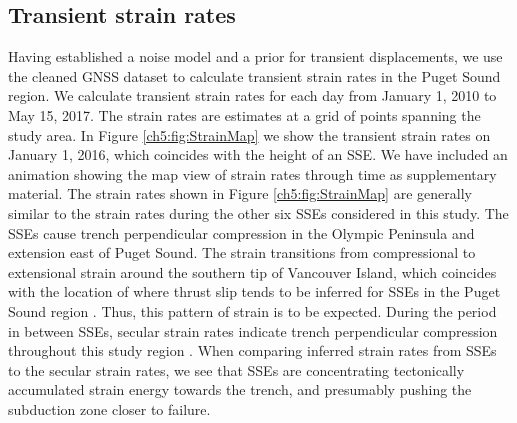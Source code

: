 \subsection{Transient strain rates}\label{ch5:sec:Results} 
Having established a noise model and a prior for transient
displacements, we use the cleaned GNSS dataset to calculate transient
strain rates in the Puget Sound region.  We calculate transient strain
rates for each day from January 1, 2010 to May 15, 2017. The strain
rates are estimates at a grid of points spanning the study area. In
Figure \ref{ch5:fig:StrainMap} we show the transient strain rates on
January 1, 2016, which coincides with the height of an SSE. We have
included an animation showing the map view of strain rates through
time as supplementary material. The strain rates shown in Figure
\ref{ch5:fig:StrainMap} are generally similar to the strain rates
during the other six SSEs considered in this study. The SSEs cause
trench perpendicular compression in the Olympic Peninsula and
extension east of Puget Sound. The strain transitions from
compressional to extensional strain around the southern tip of
Vancouver Island, which coincides with the location of where thrust
slip tends to be inferred for SSEs in the Puget Sound region
\citep[e.g.,][]{Dragert2001,Wech2009,Schmidt2010}. Thus, this pattern
of strain is to be expected. During the period in between SSEs,
secular strain rates indicate trench perpendicular compression
throughout this study region
\citep{Murray2000,McCaffrey2007,McCaffrey2013}. When comparing
inferred strain rates from SSEs to the secular strain rates, we see
that SSEs are concentrating tectonically accumulated strain energy
towards the trench, and presumably pushing the subduction zone closer
to failure.

